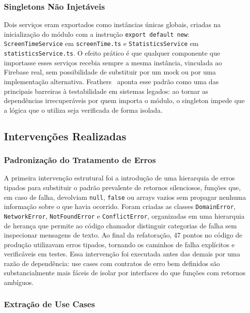\documentclass[sigconf,anonymous]{acmart}
\begin{document}
\subsubsection{Singletons Não Injetáveis}

Dois serviços eram exportados como instâncias únicas globais, criadas na inicialização do módulo com a instrução \texttt{export default new}: \texttt{ScreenTimeService} em \texttt{screenTime.ts} e \texttt{StatisticsService} em \texttt{statisticsService.ts}. O efeito prático é que qualquer componente que importasse esses serviços recebia sempre a mesma instância, vinculada ao Firebase real, sem possibilidade de substituir por um mock ou por uma implementação alternativa. Feathers~\cite{Feathers2004} aponta esse padrão como uma das principais barreiras à testabilidade em sistemas legados: ao tornar as dependências irrecuperáveis por quem importa o módulo, o singleton impede que a lógica que o utiliza seja verificada de forma isolada.

\subsection{Intervenções Realizadas}

\subsubsection{Padronização do Tratamento de Erros}

A primeira intervenção estrutural foi a introdução de uma hierarquia de erros tipados para substituir o padrão prevalente de retornos silenciosos, funções que, em caso de falha, devolviam \texttt{null}, \texttt{false} ou arrays vazios sem propagar nenhuma informação sobre o que havia ocorrido. Foram criadas as classes \texttt{DomainError}, \texttt{NetworkError}, \texttt{NotFoundError} e \texttt{ConflictError}, organizadas em uma hierarquia de herança que permite ao código chamador distinguir categorias de falha sem inspecionar mensagens de texto. Ao final da refatoração, 47 pontos no código de produção utilizavam erros tipados, tornando os caminhos de falha explícitos e verificáveis em testes. Essa intervenção foi executada antes das demais por uma razão de dependência: use cases com contratos de erro bem definidos são substancialmente mais fáceis de isolar por interfaces do que funções com retornos ambíguos.

\subsubsection{Extração de Use Cases}
\end{document}
